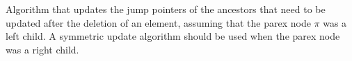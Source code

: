 \documentclass[a4paper]{article}
\newcommand{\?}{\mskip1.5mu}
\begin{document}
\begin{Algorithm}
\begin{algorithmic}
\ENDWHILE
{}
	\STATE{$\delta\leftarrow \xi$}
		\ENDWHILE
	\ENDWHILE
\ENDIF
\end{algorithmic}
\caption{\label{algo:jumpupdd}Algorithm that updates the jump pointers of the ancestors that need to be updated after the deletion
of an element, assuming that the parex node $\pi$ was a left child. A symmetric update algorithm should be 
used when the parex node was a right child.}
\end{Algorithm}
\end{document}

